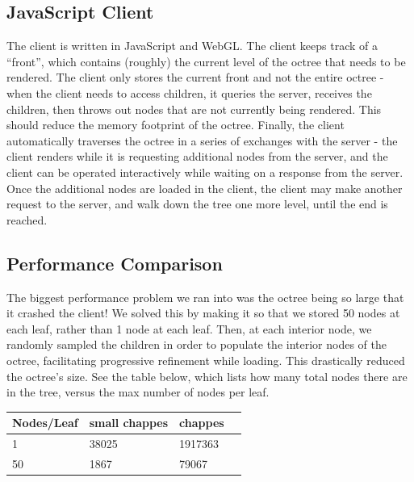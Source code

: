 \documentclass[11pt, twocolumn]{article}
\begin{document}
\subsection{JavaScript Client}
The client is written in JavaScript and WebGL. The client keeps track of a ``front'', which contains (roughly) the current level of the octree that needs to be rendered. The client only stores the current front and not the entire octree - when the client needs to access children, it queries the server, receives the children, then throws out nodes that are not currently being rendered. This should reduce the memory footprint of the octree. Finally, the client automatically traverses the octree in a series of exchanges with the server - the client renders while it is requesting additional nodes from the server, and the client can be operated interactively while waiting on a response from the server. Once the additional nodes are loaded in the client, the client may make another request to the server, and walk down the tree one more level, until the end is reached.
\subsection{Performance Comparison}
The biggest performance problem we ran into was the octree being so large that it crashed the client! We solved this by making it so that we stored 50 nodes at each leaf, rather than 1 node at each leaf. Then, at each interior node, we randomly sampled the children in order to populate the interior nodes of the octree, facilitating progressive refinement while loading. This drastically reduced the octree's size. See the table below, which lists how many total nodes there are in the tree, versus the max number of nodes per leaf.
\begin{center}
    \begin{tabular}{ | l | l | l | p{5cm} |}
    \hline
    Nodes/Leaf & small chappes & chappes \\ \hline
    1 & 38025 & 1917363 \\ \hline
    50 & 1867  &  79067 \\ \hline
    \hline
    \end{tabular}
\end{center}
\end{document}

